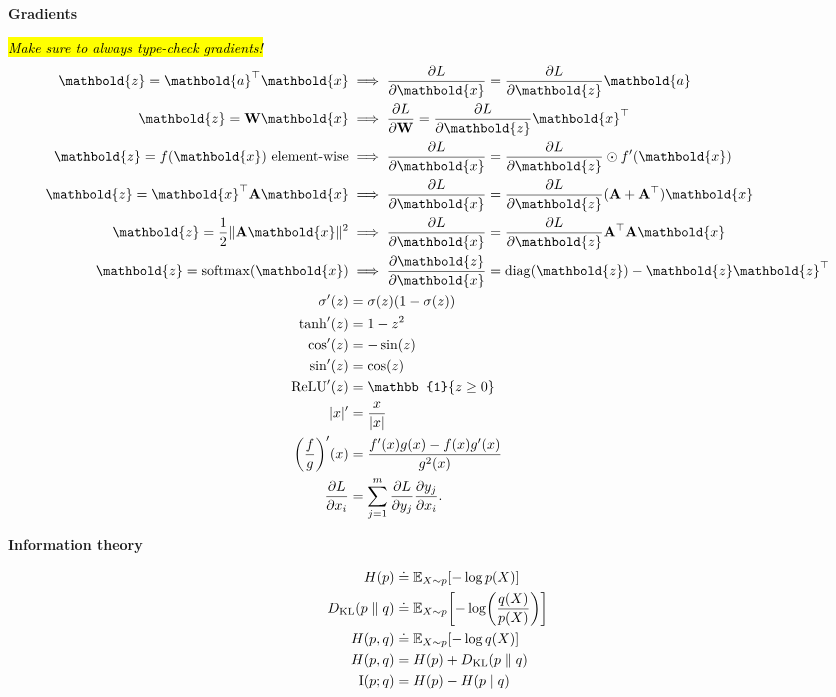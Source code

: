 \documentclass[10pt]{article}
\newenvironment{subtopic}[1]
{\begin{center}\textbf{\footnotesize \sffamily #1}\end{center}}
{}
\renewcommand{\mat}[1]{\ensuremath{\mathbf{#1}}}
\renewcommand{\vec}[1]{\ensuremath{\mathbold{#1}}}
\begin{document}
\begin{multicols*}{3}
    \begin{subtopic}{Gradients}
        \hl{\textit{Make sure to always type-check gradients!}}
        \begin{align*}
            \vec{z} = \transpose{\vec{a}} \vec{x} & \implies \pdv{L}{\vec{x}} = \pdv{L}{\vec{z}} \vec{a} \\
            \vec{z} = \mat{W} \vec{x} & \implies \pdv{L}{\mat{W}} = \pdv{L}{\vec{z}} \transpose{\vec{x}} \\
            \vec{z} = f(\vec{x}) \text{ element-wise} & \implies \pdv{L}{\vec{x}} = \pdv{L}{\vec{z}} \odot f'(\vec{x})   \\
            \vec{z} = \transpose{\vec{x}}\mat{A}\vec{x} & \implies \pdv{L}{\vec{x}} = \pdv{L}{\vec{z}} (\mat{A}+\transpose{\mat{A}})\vec{x} \\
            \vec{z} = \frac{1}{2} \| \mat{A} \vec{x} \|^2 & \implies \pdv{L}{\vec{x}} = \pdv{L}{\vec{z}} \transpose{\mat{A}} \mat{A} \vec{x} \\
            \vec{z} = \mathrm{softmax}(\vec{x}) & \implies \pdv{\vec{z}}{\vec{x}} = \mathrm{diag}(\vec{z}) - \vec{z}\transpose{\vec{z}} \\
            \sigma'(z) & = \sigma(z) (1-\sigma(z)) \\
            \tanh'(z) & = 1 - z^2 \\
            \cos'(z) & = -\sin(z) \\
            \sin'(z) & = \cos(z) \\
            \mathrm{ReLU}'(z) & = \mathbb{1}\{ z \geq 0 \} \\
            |x|' & = \frac{x}{|x|} \\
            \lft( \frac{f}{g} \rgt)'(x) & = \frac{f'(x) g(x) - f(x) g'(x)}{g^2(x)} \\
            \pdv{L}{x_i} & = \sum_{j=1}^{m} \pdv{L}{y_j} \pdv{y_j}{x_i}.
        \end{align*}
    \end{subtopic}

    \begin{subtopic}{Information theory}
        \begin{align*}
            H(p) & \doteq \E_{X \sim p}[-\log p(X)] \\
            D_{\mathrm{KL}}(p\;\|\;q) & \doteq \E_{X \sim p}\lft[ -\log \lft( \frac{q(X)}{p(X)} \rgt) \rgt] \\
            H(p, q) & \doteq \E_{X \sim p}[-\log q(X)] \\
            H(p, q) & = H(p) + D_{\mathrm{KL}}(p\;\|\;q) \\
            \mathrm{I}(p; q) & = H(p) - H(p \mid q) \\
        \end{align*}
    \end{subtopic}


\end{multicols*}
\end{document}
